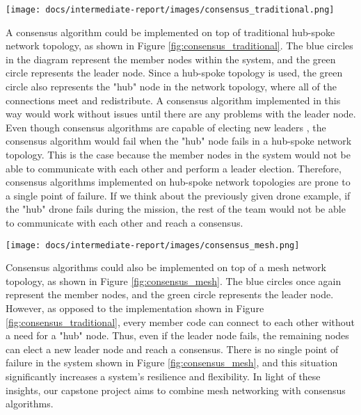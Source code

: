 \documentclass[compsoc]{IEEEtran}
\begin{document}

\begingroup
    \centering
    \medskip
    \texttt{[image: docs/intermediate-report/images/consensus\_traditional.png]}
    \label{fig:consensus_traditional}
\endgroup

A consensus algorithm could be implemented on top of traditional hub-spoke network topology, as shown in Figure \ref{fig:consensus_traditional}. The blue circles in the diagram represent the member nodes within the system, and the green circle represents the leader node. Since a hub-spoke topology is used, the green circle also represents the "hub" node in the network topology, where all of the connections meet and redistribute. A consensus algorithm implemented in this way would work without issues until there are any problems with the leader node. Even though consensus algorithms are capable of electing new leaders \cite{raft_paper}, the consensus algorithm would fail when the "hub" node fails in a hub-spoke network topology. This is the case because the member nodes in the system would not be able to communicate with each other and perform a leader election. Therefore, consensus algorithms implemented on hub-spoke network topologies are prone to a single point of failure. If we think about the previously given drone example, if the "hub" drone fails during the mission, the rest of the team would not be able to communicate with each other and reach a consensus.

\begingroup
    \centering
    \medskip
    \texttt{[image: docs/intermediate-report/images/consensus\_mesh.png]}
    \label{fig:consensus_mesh}
\endgroup

Consensus algorithms could also be implemented on top of a mesh network topology, as shown in Figure \ref{fig:consensus_mesh}. The blue circles once again represent the member nodes, and the green circle represents the leader node. However, as opposed to the implementation shown in Figure \ref{fig:consensus_traditional}, every member code can connect to each other without a need for a "hub" node. Thus, even if the leader node fails, the remaining nodes can elect a new leader node and reach a consensus. There is no single point of failure in the system shown in Figure \ref{fig:consensus_mesh}, and this situation significantly increases a system's resilience and flexibility. In light of these insights, our capstone project aims to combine mesh networking with consensus algorithms.
\end{document}
